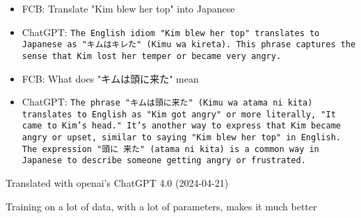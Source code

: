 \documentclass[a4paper,landscape,headrule,footrule,xetex]{foils}
\begin{document}
\begin{itemize}
\item FCB: Translate "Kim blew her top" into Japanese
\item ChatGPT:
\texttt{The English idiom "Kim blew her top" translates to Japanese as "キムはキレた" (Kimu wa kireta). This phrase captures the sense that Kim lost her temper or became very angry.}
\item FCB: What does "キムは頭に来た" mean
\item ChatGPT:  \texttt{The phrase "キムは頭に来た" (Kimu wa atama ni kita) translates to English as "Kim got angry" or more literally, "It came to Kim's head." It's another way to express that Kim became angry or upset, similar to saying "Kim blew her top" in English. \\
The expression  "頭に 来た" (atama ni kita) is a common way in Japanese to describe someone getting angry or frustrated.}
\end{itemize}

\hfill Translated with openai's ChatGPT 4.0 (2024-04-21)

Training on a lot of data, with a lot of parameters, makes it much better





\end{document}

